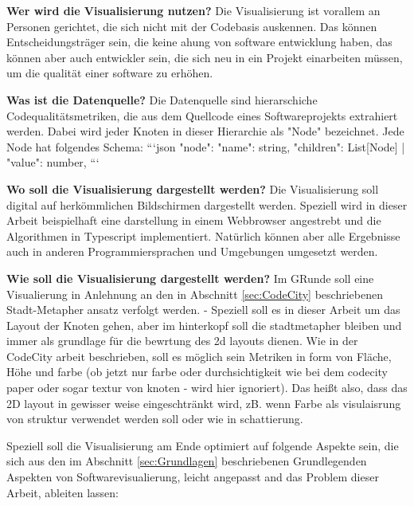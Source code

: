 \textbf{Wer wird die Visualisierung nutzen?}
Die Visualisierung ist vorallem an Personen gerichtet, die sich nicht mit der Codebasis auskennen. Das können Entscheidungsträger sein, die keine ahung von software entwicklung haben, das können aber auch entwickler sein, die sich neu in ein Projekt einarbeiten müssen, um die qualität einer software zu erhöhen.

\textbf{Was ist die Datenquelle?}
Die Datenquelle sind hierarschiche Codequalitätsmetriken, die aus dem Quellcode eines Softwareprojekts extrahiert werden. 
Dabei wird jeder Knoten in dieser Hierarchie als "Node" bezeichnet.
Jede Node hat folgendes Schema:
```json
"node": {
    "name": string,
    "children": List[Node] | "value": number,
}
```


\textbf{Wo soll die Visualisierung dargestellt werden?}
Die Visualisierung soll digital auf herkömmlichen Bildschirmen dargestellt werden. Speziell wird in dieser Arbeit beispielhaft eine darstellung in einem Webbrowser angestrebt und die Algorithmen in Typescript implementiert. Natürlich können aber alle Ergebnisse auch in anderen Programmiersprachen und Umgebungen umgesetzt werden.


\textbf{Wie soll die Visualisierung dargestellt werden?}
Im GRunde soll eine Visualierung in Anlehnung an den in Abschnitt \ref{sec:CodeCity} beschriebenen Stadt-Metapher ansatz verfolgt werden. - Speziell soll es in dieser Arbeit um das Layout der Knoten gehen, aber im hinterkopf soll die stadtmetapher bleiben und immer als grundlage für die bewrtung des 2d layouts dienen. 
Wie in der CodeCity arbeit beschrieben, soll es möglich sein Metriken in form von Fläche, Höhe und farbe (ob jetzt nur farbe oder durchsichtigkeit wie bei dem codecity paper oder sogar textur von knoten - wird hier ignoriert). Das heißt also, dass das 2D layout in gewisser weise eingeschtränkt wird, zB. wenn Farbe als visulaisrung von struktur verwendet werden soll oder wie in \cite{bruls2000squarified} schattierung.

Speziell soll die Visualisierung am Ende optimiert auf folgende Aspekte sein, die sich aus den im Abschnitt \ref{sec:Grundlagen} beschriebenen Grundlegenden Aspekten von Softwarevisualierung, leicht angepasst and das Problem dieser Arbeit, ableiten lassen: 

